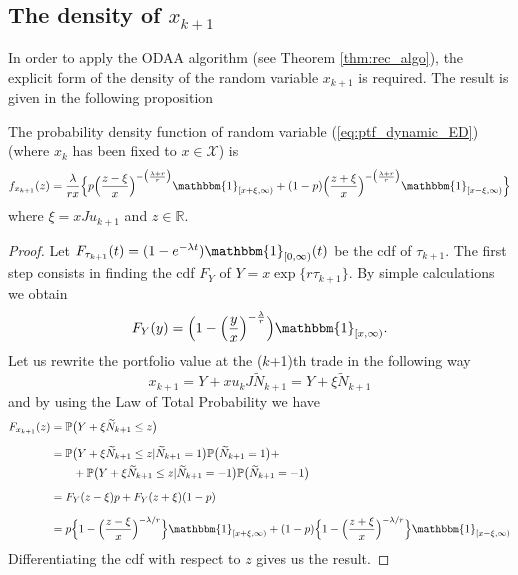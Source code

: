 \subsection{The density of $x_{k+1}$}
In order to apply the ODAA algorithm (see Theorem \ref{thm:rec_algo}), the explicit form of the density of the random variable $x_{k+1}$ is required. The result is given in the following proposition
\begin{proposition}\label{prop:density_portfolio_basic}
	The probability density function of random variable (\ref{eq:ptf_dynamic_ED}) (where $x_k$ has been fixed to $x \in \mathcal{X}$) is
	\begin{equation*}
	f_{x_{k+1}}(z)= 
	\frac{\lambda}{r x}\Big\{p\Big(\frac{z-\xi}{x}\Big)^{-\big(\frac{\lambda+r}{r}\big)}\mathbbm{1}_{[x+\xi,\infty)} + 
	(1-p)\Big(\frac{z+\xi}{x}\Big)^{-\big(\frac{\lambda+r}{r}\big)}\mathbbm{1}_{[x-\xi,\infty)}\Big\}
	\end{equation*}
	where $\xi=xJu_{k+1}$ and $z \in \mathbb{R}$.
\end{proposition}
\begin{proof}
	Let $F_{\tau_{k+1}}(t)= (1-e^{-\lambda t})\mathbbm{1}_{[0,\infty)}(t)$ be the cdf of $\tau_{k+1}$. The first step consists in finding the cdf $F_Y$ of $Y=x\exp\{r \tau_{k+1}\}$. By simple calculations we obtain
	\[F_Y(y)=\Big(1-\Big(\frac{y}{x}\Big)^{-\frac{\lambda}{r}}\Big)\mathbbm{1}_{[x,\infty)}. \]
	Let us rewrite the portfolio value at the ($k$+1)th trade in the following way \[ x_{k+1} = Y + xu_kJ\widetilde{N}_{k+1}=Y+\xi \widetilde{N}_{k+1} \]
	and by using the Law of Total Probability we have
	\begin{align*}
	F_{x_{k+1}}(z) & = \mathbb{P}\big(Y+\xi \widetilde{N}_{k+1}\leq z\big)\\[1.5ex]
	& = \mathbb{P}\big(Y+\xi \widetilde{N}_{k+1}\leq z\lvert \widetilde{N}_{k+1}=1\big)\mathbb{P}\big(\widetilde{N}_{k+1}=1\big)+\\
	&\qquad +\mathbb{P}\big(Y+\xi \widetilde{N}_{k+1}\leq z\lvert \widetilde{N}_{k+1}=-1\big)\mathbb{P}\big(\widetilde{N}_{k+1}=-1\big)\\[1.5ex]
	& = F_Y(z-\xi)p+F_Y(z+\xi)(1-p)\\[1.5ex]
	& = p\Big\{1-\Big(\frac{z-\xi}{x}\Big)^{-\lambda/r} \Big\}\mathbbm{1}_{[x+\xi,\infty)}+
	(1-p)\Big\{1-\Big(\frac{z+\xi}{x}\Big)^{-\lambda/r} \Big\}\mathbbm{1}_{[x-\xi,\infty)}
	\end{align*}
	Differentiating the cdf with respect to $z$ gives us the result.
\end{proof}


